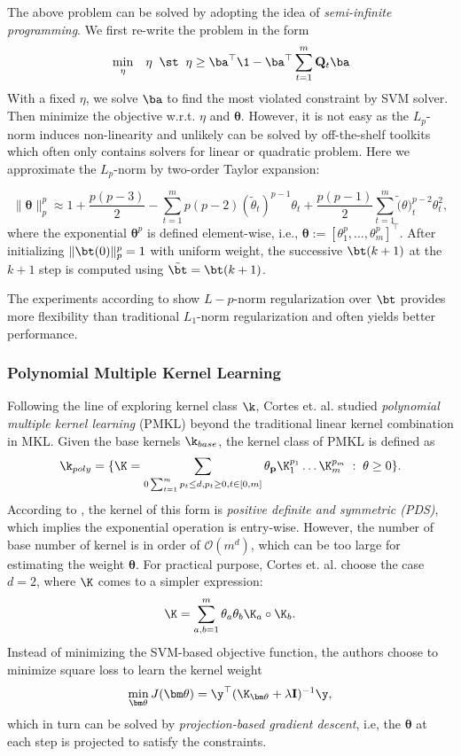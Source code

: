 The above problem can be solved by adopting the idea of {\em semi-infinite programming}\cite{jmlr/SonnenburgRSS06}. We first re-write the problem in the form
 \begin{eqnarray}
 &\min_{\eta}& \eta \;\;\st\;\; \eta \geq \ba^\top\1 - \ba^\top\sum_{t=1}^{m}\mathbf Q_t\ba \nonumber\\
 \end{eqnarray}
With a fixed $\eta$, we solve $\ba$ to find the most violated constraint by SVM solver. Then minimize the objective w.r.t. $\eta$ and $\bm\theta$. However, it is not easy as the $L_p$-norm induces non-linearity and unlikely can be solved by off-the-shelf toolkits which often only contains solvers for linear or quadratic problem. Here we approximate the $L_p$-norm by two-order Taylor expansion\cite{nips/KloftBSLMZ09}:

\[
\| \bm\theta \|^p_p \approx 1 + \frac{p(p - 3)}{2} - \sum_{t=1}^{m}p(p - 2)(\tilde{\theta}_t)^{p - 1}\theta_t + \frac{p(p - 1)}{2}\sum_{t = 1}^{m}\tilde(\theta)_t^{p - 2}\theta_t^2,
\]
where the exponential $\bm\theta^p$ is defined element-wise, i.e., $\bm\theta := [\theta_1^p,\ldots,\theta_{m}^p]^\top$. After initializing $\|\bt(0)\|^p_p=1$ with uniform weight, the successive $\bt(k + 1)$ at the $k+1$ step is computed using $\tilde{\bt} = \bt(k + 1)$.

The experiments according to \cite{nips/KloftBSLMZ09} show $L-p$-norm regularization over $\bt$ provides more flexibility than traditional $L_1$-norm regularization and often yields better performance.

\subsubsection{Polynomial Multiple Kernel Learning}

Following the line of exploring kernel class $\k$, Cortes et. al. studied {\em polynomial multiple kernel learning} (PMKL) beyond the traditional linear kernel combination in MKL. Given the base kernels $\k_{base}$, the kernel class of PMKL is defined as
\[
\k_{poly}=\{ \K = \sum_{0\sum_{t=1}^{m}p_t\leq d, p_t \geq 0, t\in[0,m]}\theta_{\mathbf p}\K_1^{p_1}\ldots\K_{m}^{p_{m}}\;:\;\theta \geq 0 \}.
\]
According to \cite{nips/CortesMR09}, the kernel of this form is {\em positive definite and symmetric (PDS)}, which implies the exponential operation is entry-wise. However, the number of base number of kernel is in order of $\mathcal O(m^d)$, which can be too large for estimating the weight $\bm\theta$. For practical purpose, Cortes et. al. choose the case $d=2$, where $\K$ comes to a simpler expression:
\[
\K = \sum_{a,b=1}^{m}\theta_a\theta_b\K_a\circ\K_b.
\]
Instead of minimizing the SVM-based objective function, the authors choose to minimize square loss to learn the kernel weight
\[
\min_{\bm\theta} J(\bm\theta) = \y^\top(\K_{\bm\theta} + \lambda\mathbf I)^{-1}\y,
\]
which in turn can be solved by {\em projection-based gradient descent}, i.e, the $\bm\theta$ at each step is projected to satisfy the constraints.

